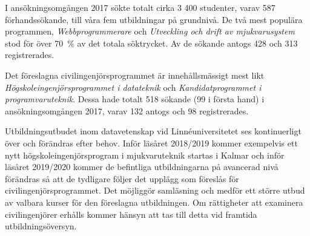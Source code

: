 I ansökningsomgången 2017 sökte totalt cirka 3 400 studenter, varav 587 förhandssökande, till våra fem utbildningar på grundnivå. De två mest populära programmen, \emph{Webbprogrammerare} och \emph{Utveckling och drift av mjukvarusystem} stod för över 70~\% av det totala söktrycket. Av de sökande antogs 428 och 313 registrerades.

Det föreslagna civilingenjörsprogrammet är innehållsmässigt mest likt \emph{Högskoleingenjörsprogrammet i datateknik} och \emph{Kandidatprogrammet i programvaruteknik}. Dessa hade totalt 518 sökande (99 i första hand) i ansökningsomgången 2017, varav 132 antogs och 98 registrerades.

Utbildningsutbudet inom datavetenskap vid Linnéuniversitetet ses kontinuerligt över och förändras efter behov. Inför läsåret 2018/2019 kommer exempelvis ett nytt högskoleingenjörsprogram i mjukvaruteknik startas i Kalmar och inför läsåret 2019/2020 kommer de befintliga utbildningarna på avancerad nivå förändras så att de tydligare följer det upplägg som föreslås för civilingenjörsprogrammet. Det möjliggör samläsning och medför ett större utbud av valbara kurser för den föreslagna utbildningen. Om rättigheter att examinera civilingenjörer erhålls kommer hänsyn att tas till detta vid framtida utbildningsöversyn.
